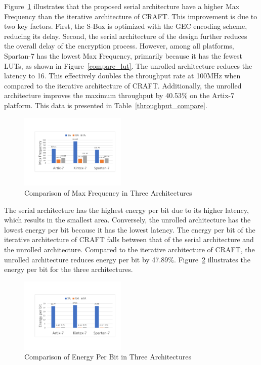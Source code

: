 \documentclass[final,5p,times,twocolumn]{elsarticle}
\begin{document}
Figure~\ref{compare-maxF} illustrates that the proposed serial architecture have a higher Max Frequency than the iterative architecture of CRAFT. This improvement is due to two key factors. First, the S-Box is optimized with the GEC encoding scheme, reducing its delay. Second, the serial architecture of the design further reduces the overall delay of the encryption process. However, among all platforms, Spartan-7 has the lowest Max Frequency, primarily because it has the fewest LUTs, as shown in Figure~\ref{compare_lut}. The unrolled architecture reduces the latency to 16. This effectively doubles the throughput rate at 100MHz when compared to the iterative architecture of CRAFT. Additionally, the unrolled architecture improves the maximum throughput by 40.53\% on the Artix-7 platform. This data is presented in Table~\ref{throughput_compare}.

\begin{figure}
    \centering
    \includegraphics[width=0.45\textwidth]{./fig/compare-maxf.pdf}
    \caption{Comparison of Max Frequency in Three Architectures}\label{compare-maxF}
\end{figure}

The serial architecture has the highest energy per bit due to its higher latency, which results in the smallest area. Conversely, the unrolled architecture has the lowest energy per bit because it has the lowest latency. The energy per bit of the iterative architecture of CRAFT falls between that of the serial architecture and the unrolled architecture. Compared to the iterative architecture of CRAFT, the unrolled architecture reduces energy per bit by 47.89\%. Figure~\ref{compare-energy} illustrates the energy per bit for the three architectures.

\begin{figure}
    \centering
    \includegraphics[width=0.45\textwidth]{./fig/compare-energy.pdf}
    \caption{Comparison of Energy Per Bit in Three Architectures}\label{compare-energy}
\end{figure}
\end{document}

